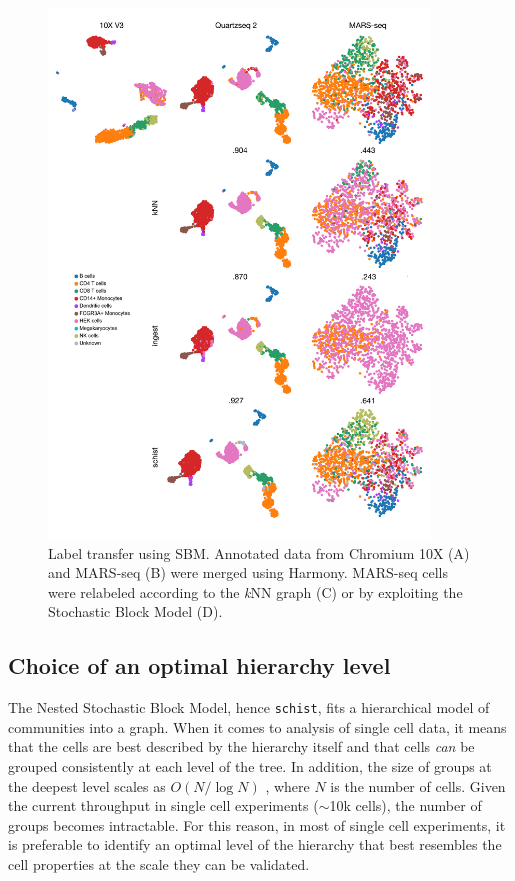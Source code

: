 \documentclass[10pt]{article}
\begin{document}
\begin{figure}[H]
\centering
\includegraphics[keepaspectratio,width=0.9\textwidth,height=\textheight]{Figure_Label_Transfer.png}
\caption[]{Label transfer using SBM. Annotated data from Chromium 10X (A) and  MARS-seq (B) were merged using Harmony. MARS-seq cells were relabeled according to the \emph{k}NN graph (C) or by exploiting the Stochastic Block Model (D). }\label{Figure_Label_Transfer}
\end{figure}

\subsection*{Choice of an optimal hierarchy level}

The Nested Stochastic Block Model, hence \texttt{schist}, fits a hierarchical model of communities into a graph. When it comes to analysis of single cell data, it means that the cells are best described by the hierarchy itself and that cells \emph{can} be grouped consistently at each level of the tree. In addition, the size of groups at the deepest level scales as $O(N/\log{N})$ \cite{peixoto_2014_h}, where $N$ is the number of cells. Given the current throughput in single cell experiments ($\sim$10k cells), the number of groups becomes intractable. For this reason, in most of single cell experiments, it is preferable to identify an optimal level of the hierarchy that best resembles the cell properties at the scale they can be validated. 
\end{document}
